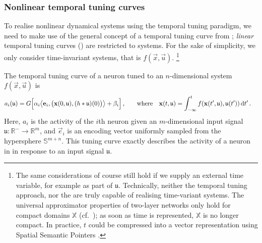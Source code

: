 \subsubsection{Nonlinear temporal tuning curves}

To realise nonlinear dynamical systems using the temporal tuning paradigm, we need to make use of the general concept of a temporal tuning curve from ; \emph{linear} temporal tuning curves () are restricted to \LTI systems.
For the sake of simplicity, we only consider time-invariant systems, that is $f(\vec x, \vec u)$.%
\footnote{
The same considerations of course still hold if we supply an external time variable, for example as part of $\mathfrak{u}$.
Technically, neither the temporal tuning approach, nor the \NEF are truly capable of realising time-variant systems. The universal approximator properties of two-layer networks only hold for compact domains $\mathbb{X}$ (cf.~); as soon as time is represented, $\mathbb{X}$ is no longer compact. In practice, $t$ could be compressed into a vector representation using Spatial Semantic Pointers \citep{komer2020biologically}.}

The temporal tuning curve of a neuron tuned to an $n$-dimensional system $f(\vec x, \vec u)$ is
\begin{align*}
	a_i(\mathfrak{u}) &=
		G\Bigl[ \alpha_i \bigl\langle \vec e_i, \bigl(\vec x(0, \mathfrak{u}), (h \ast \mathfrak{u})(0) \bigr) \bigr\rangle + \beta_i \Bigr] \,,
		& \quad \text{where} \quad
			\vec x(t, \mathfrak{u}) &=  \int_{-\infty}^t f(\vec x(t', \mathfrak{u}), \mathfrak{u}(t')) \,\mathrm{d}t' \,.
\end{align*}
Here, $a_i$ is the activity of the $i$th neuron given an $m$-dimensional input signal $\mathfrak{u} : \mathbb{R}^- \longrightarrow \mathbb{R}^m$, and $\vec e_i$ is an encoding vector uniformly sampled from the hypersphere $\mathbb{S}^{m + n}$.
This tuning curve exactly describes the activity of a neuron in  in response to an input signal $\mathfrak{u}$.

